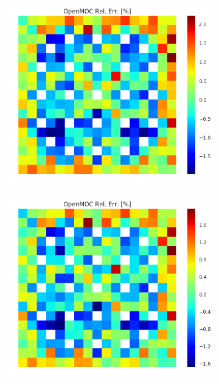 \begin{figure}[h!]
\begin{subfigure}{.33\textwidth}
  \caption{}
  \label{fig:chap8-assm-1.6-null-capt-2}
\end{subfigure}%
\begin{subfigure}{.33\textwidth}
  \centering
  \includegraphics[width=\linewidth]{figures/quantification/assm-16/null-capt-err-8}
  \caption{}
  \label{fig:chap8-assm-1.6-null-capt-8}
\end{subfigure}%
\begin{subfigure}{.33\textwidth}
  \centering
  \includegraphics[width=\linewidth]{figures/quantification/assm-16/null-capt-err-70}

\end{subfigure}
\end{figure}
